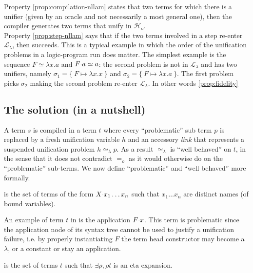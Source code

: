 \documentclass[sigconf,natbib=false,review]{acmart}
\newcommand{\appsep}{\ensuremath{\textcolor{lightgray}{\cdot}}}
\newcommand{\EqualRel}{\ensuremath{=}}
\newcommand{\UnifRel}{\ensuremath{\simeq}}
\newcommand{\Eo}{\ensuremath{\EqualRel_o}\xspace}
\newcommand{\Ue}{\ensuremath{\UnifRel_\lambda}\xspace}
\newcommand{\llambda}{\ensuremath{\mathcal{L}_\lambda}\xspace}
\newcommand{\Ho}{\ensuremath{\mathcal{H}_o}\xspace}
\begin{document}
\noindent
Property \ref{prop:compilation-nllam} states that two terms for which
there is a unifier (given by an oracle and not necessarily a most general one),
then the compiler generates two terms that unify in \Ho.\\
Property \ref{prop:step-nllam} says that if the two terms involved in a step
re-enter \llambda, then \hstep succeeds. This is a typical example
in which the order of the unification problems in a logic-program run
does matter. The simplest example is the sequence $F \UnifRel \lambda x.a$ and
$F \appsep a \UnifRel a$: the second problem is not in \llambda and has two
unifiers, namely $\sigma_1 = \{~ F \mapsto \lambda x.x ~\}$ and
$\sigma_2 = \{~ F \mapsto \lambda x.a ~\}$. The first problem picks $\sigma_2$
making the second problem re-enter \llambda. In other words
\cref{prop:fidelity} 

\subsection{The solution (in a nutshell)}
\label{sec:nutshell}
A term $s$ is compiled in a term $t$ where every
``problematic'' sub term $p$ is replaced by a fresh unification variable $h$
and an accessory \emph{link} that represents a suspended unification problem
$h \Ue p$. As a result \Ue is ``well behaved'' on $t$, in the sense that
it does not contradict \Eo as it would otherwise do on the
``problematic'' sub-terms. We now define ``problematic'' and ``well behaved''
more formally.

\begin{definition}[\maybebeta]\label{def:maybebeta}
  \maybebeta is the set of terms of the form $X \appsep x_1 \ldots x_n$
  such that $x_1 \ldots x_n$ are distinct names (of bound variables).
\end{definition}

\noindent
An example of term $t$ in \maybebeta{} is the application $F \appsep x$.
This term is problematic since the application node of
its syntax tree cannot be used to justify a
unification failure, i.e. by properly instantiating $F$ the term
head constructor may become a $\lambda$, or a constant or stay an application.

\begin{definition}[\maybeeta]\label{def:maybeeta}
  \maybeeta is the set of terms $t$ such that $\exists \rho, \rho t$
  is an eta expansion.
\end{definition}
\end{document}
